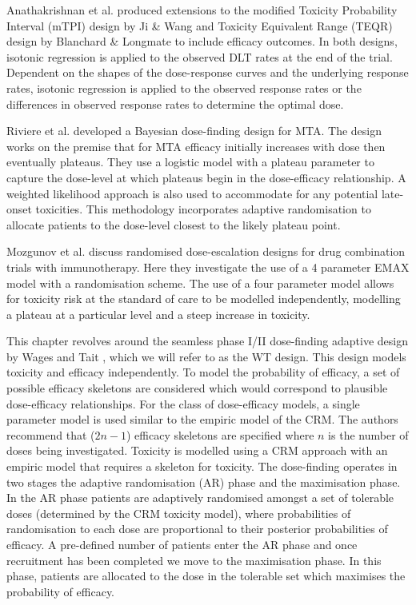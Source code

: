 Anathakrishnan et al. \cite{ananthakrishnanExtensionsMTPITEQR2018} produced extensions to the modified Toxicity Probability Interval (mTPI) design by Ji \& Wang \cite{jiModifiedToxicityProbability2013} and Toxicity Equivalent Range (TEQR) design by Blanchard \& Longmate \cite{blanchardToxicityEquivalenceRange2011} to include efficacy outcomes. In both designs, isotonic regression is applied to the observed DLT rates at the end of the trial. Dependent on the shapes of the dose-response curves and the underlying response rates, isotonic regression is applied to the observed response rates or the differences in observed response rates to determine the optimal dose. 

Riviere et al. \cite{rivierePhaseIIDosefinding2018} developed a Bayesian dose-finding design for MTA. The design works on the premise that for MTA efficacy initially increases with dose then eventually plateaus. They use a logistic model with a plateau parameter to capture the dose-level at which plateaus begin in the dose-efficacy relationship. A weighted likelihood approach is also used to accommodate for any potential late-onset toxicities. This methodology incorporates adaptive randomisation to allocate patients to the dose-level closest to the likely plateau point.

Mozgunov et al. \cite{mozgunovRandomizedDoseescalationDesigns2019} discuss randomised dose-escalation designs for drug combination trials with immunotherapy. Here they investigate the use of a 4 parameter EMAX model with a randomisation scheme. The use of a four parameter model allows for toxicity risk at the standard of care to be modelled independently, modelling a plateau at a particular level and a steep increase in toxicity. 

This chapter revolves around the seamless phase \RN{1}/\RN{2} dose-finding adaptive design by Wages and Tait \cite{wagesSeamlessPhaseII2015}, which we will refer to as the WT design. This design models toxicity and efficacy independently. To model the probability of efficacy, a set of possible efficacy skeletons are considered which would correspond to plausible dose-efficacy relationships. For the class of dose-efficacy models, a single parameter model is used similar to the empiric model of the CRM. The authors recommend that ($2n - 1$) efficacy skeletons are specified where $n$ is the number of doses being investigated. Toxicity is modelled using a CRM approach with an empiric model that requires a skeleton for toxicity. The dose-finding operates in two stages the adaptive randomisation (AR) phase and the maximisation phase. In the AR phase patients are adaptively randomised amongst a set of tolerable doses (determined by the CRM toxicity model), where probabilities of randomisation to each dose are proportional to their posterior probabilities of efficacy. A pre-defined number of patients enter the AR phase and once recruitment has been completed we move to the maximisation phase. In this phase, patients are allocated to the dose in the tolerable set which maximises the probability of efficacy.  

